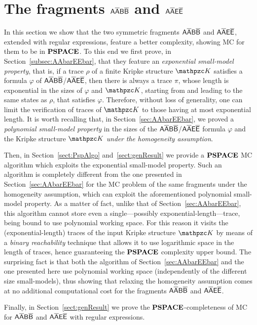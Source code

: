 \section{The fragments $\mathsf{A\overline{A}B\overline{B}}$ and $\mathsf{A\overline{A}E\overline{E}}$}\label{sec:AABB}
In this section we show that the two symmetric fragments $\mathsf{A\overline{A}B\overline{B}}$ and $\mathsf{A\overline{A}E\overline{E}}$,
extended with regular expressions, 
feature a better complexity, showing MC for them to be in $\textbf{PSPACE}$.  To this end we first prove, in Section~\ref{subsec:AAbarEEbar}, that they feature an \emph{exponential small-model property}, that is, if a trace $\rho$ of a finite Kripke structure $\Ku$ satisfies a formula $\varphi$ of $\mathsf{A\overline{A}B\overline{B}}$/$\mathsf{A\overline{A}E\overline{E}}$, then there is always a trace $\pi$, whose length is exponential 
in the sizes of $\varphi$ and $\Ku$, starting from and leading to the same states as $\rho$, that satisfies $\varphi$.  
Therefore, without loss of generality, one can limit the verification of traces of $\Ku$ to those having at most exponential length. It is worth recalling that, in Section~\ref{sec:AAbarEEbar}, we proved a \emph{polynomial small-model property} in the sizes of the  $\mathsf{A\overline{A}B\overline{B}}$/$\mathsf{A\overline{A}E\overline{E}}$ formula $\varphi$ and the Kripke structure $\Ku$ \emph{under the homogeneity assumption}.

Then, in Section~\ref{sect:PspAlgo} and~\ref{sect:genResult} we provide a $\textbf{PSPACE}$ MC algorithm which exploits the exponential small-model property. Such an algorithm is completely different from the one presented in Section~\ref{sec:AAbarEEbar} for 
the MC problem of the same fragments under the homogeneity assumption, which can
exploit the aforementioned polynomial small-model property. As a matter of fact, unlike that of Section~\ref{sec:AAbarEEbar}, this algorithm cannot store even a single---possibly exponential-length---trace, being bound to use polynomial working space. For this reason it visits the (exponential-length) traces of the input Kripke structure $\Ku$ by means of a \emph{binary reachability} technique that allows it to use logarithmic space in the length of traces, hence guaranteeing the $\textbf{PSPACE}$ complexity upper bound. The surprising fact is that both the algorithm of Section~\ref{sec:AAbarEEbar} and the one presented here use polynomial working space (independently of the different size small-models), thus showing that relaxing the homogeneity assumption comes at no additional computational cost for the fragments $\mathsf{A\overline{A}B\overline{B}}$ and $\mathsf{A\overline{A}E\overline{E}}$.

Finally, in Section~\ref{sect:genResult} we prove the $\textbf{PSPACE}$-completeness of MC for $\mathsf{A\overline{A}B\overline{B}}$ and $\mathsf{A\overline{A}E\overline{E}}$ with regular expressions.

